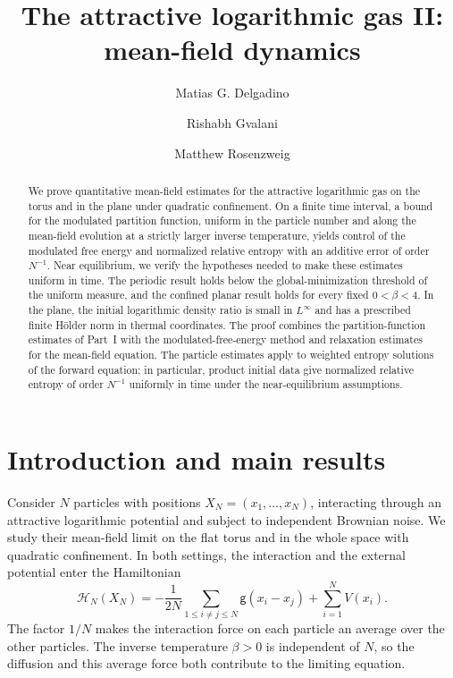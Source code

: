 \documentclass[11pt,reqno]{amsart}
\title[The attractive logarithmic gas II]{The attractive logarithmic gas II: mean-field dynamics}
\author[M. G. Delgadino]{Matias G. Delgadino}
\author[R. Gvalani]{Rishabh Gvalani}
\author[M. Rosenzweig]{Matthew Rosenzweig}
\date{}
\numberwithin{equation}{section}
\theoremstyle{definition}
\theoremstyle{remark}
\newcommand{\g}{\mathsf g}
\newcommand{\HN}{\mathcal H_N}
\begin{document}
\begin{abstract}
{\ifdefined\MarkedRevision\color{red}\fi
We prove quantitative mean-field estimates for the attractive logarithmic gas on the torus and in the plane under quadratic confinement. On a finite time interval, a bound for the modulated partition function, uniform in the particle number and along the mean-field evolution at a strictly larger inverse temperature, yields control of the modulated free energy and normalized relative entropy with an additive error of order $N^{-1}$. Near equilibrium, we verify the hypotheses needed to make these estimates uniform in time. The periodic result holds below the global-minimization threshold of the uniform measure, and the confined planar result holds for every fixed $0<\beta<4$. In the plane, the initial logarithmic density ratio is small in $L^\infty$ and has a prescribed finite H\"older norm in thermal coordinates. The proof combines the partition-function estimates of Part~I with the modulated-free-energy method and relaxation estimates for the mean-field equation. The particle estimates apply to weighted entropy solutions of the forward equation; in particular, product initial data give normalized relative entropy of order $N^{-1}$ uniformly in time under the near-equilibrium assumptions.
}
\end{abstract}
\maketitle

\begingroup\ifdefined\MarkedRevision\color{red}\fi
\section{Introduction and main results}\label{sec:introduction}

Consider $N$ particles with positions $X_N=(x_1,\ldots,x_N)$, interacting through an attractive logarithmic potential and subject to independent Brownian noise. We study their mean-field limit on the flat torus and in the whole space with quadratic confinement. In both settings, the interaction and the external potential enter the Hamiltonian
\begin{equation}\label{eq:physical-potential}
 \HN(X_N)
 =-\frac1{2N}\sum_{1\leq i\ne j\leq N}\g(x_i-x_j)
   +\sum_{i=1}^N V(x_i).
\end{equation}
The factor $1/N$ makes the interaction force on each particle an average over the other particles. The inverse temperature $\beta>0$ is independent of $N$, so the diffusion and this average force both contribute to the limiting equation.
\end{document}
